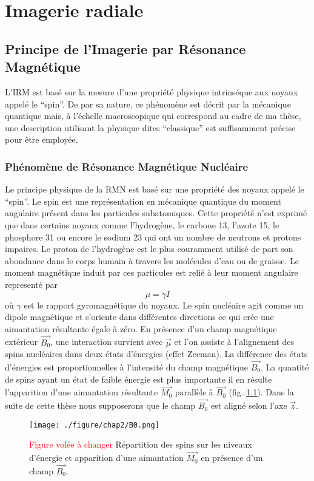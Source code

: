 \chapter{Imagerie radiale}

\section{Principe de l'Imagerie par Résonance Magnétique}

L’IRM est basé sur la mesure d’une propriété physique intrinséque aux noyaux appelé le “spin”. De par sa nature, ce phénomène est décrit par la mécanique quantique mais, à l’échelle macroscopique qui correspond au cadre de ma thèse, une description utilisant la physique dites “classique” est suffisamment précise pour être employée.
\cite{bernstein2004handbook,brown2014magnetic,zhi2000principles}

\subsection{Phénomène de Résonance Magnétique Nucléaire}

Le principe physique de la RMN est basé sur une propriété des noyaux appelé le “spin”. Le spin est une représentation en mécanique quantique du moment angulaire présent dans les particules subatomiques. Cette propriété n’est exprimé que dans certains noyaux comme l’hydrogène, le carbone 13, l’azote 15, le phosphore 31 ou encore le sodium 23 qui ont un nombre de neutrons et protons impaires. Le proton de l’hydrogène est le plus couramment utilisé de part son abondance dans le corps humain à travers les molécules d’eau ou de graisse. Le moment magnétique induit par ces particules est relié à leur moment angulaire representé par
	\begin{equation}
\mu=\gamma I
\end{equation}
où $\gamma$ est le rapport gyromagnétique du noyaux. Le spin nucléaire agit comme un dipole magnétique et s’oriente dans différentes directions ce qui crée une aimantation résultante égale à zéro. En présence d’un champ magnétique extérieur $\overrightarrow{B_0}$, une interaction survient avec $\overrightarrow{\mu}$ et l'on assiste à l'alignement des spins nucléaires dans deux états d'énergies (effet Zeeman). La différence des états d’énergies est proportionnelles à l’intensité du champ magnétique $\overrightarrow{B_0}$. La quantité de spins ayant un état de faible énergie est plus importante il en résulte l'apparition d'une aimantation résultante $\overrightarrow{M_0}$ parallèle à $\overrightarrow{B_0}$ (fig. \ref{B0}). Dans la suite de cette thèse nous supposerons que le champ $\overrightarrow{B_0}$ est aligné selon l’axe $\overrightarrow{z}$.
	\begin{figure}
\centering
\texttt{[image: ./figure/chap2/B0.png]}
\caption[Aimantation dans un champ magnétique]{\label{B0}\textcolor{red}{Figure volée à changer} Répartition des spins sur les niveaux d'énergie et apparition d'une aimantation $\overrightarrow{M_0}$ en présence d'un champ $\overrightarrow{B_0}$. }
\end{figure}

